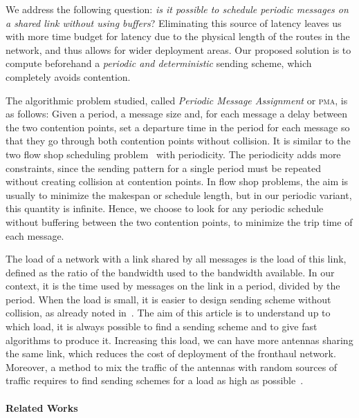 \documentclass[a4paper,UKenglish,cleveref, autoref, thm-restate]{lipics-v2019}
\newcommand\pma{\textsc{pma}\xspace}
\begin{document}
We address the following question: \emph{is it possible to schedule periodic messages on a shared link without using buffers}? Eliminating this source of latency leaves us with more time budget for latency due to the physical length of the routes in the network, and thus allows for wider deployment areas. Our proposed solution is to compute beforehand a \emph{periodic and deterministic} sending scheme, which completely avoids contention.  

The algorithmic problem studied, called \emph{Periodic Message Assignment} or \pma, is as follows: Given a period, a message size and, for each message a delay between the two contention points, set a departure time in the period for each message so that they go through both contention points without collision. It is similar to the two flow shop scheduling problem~\cite{yu2004minimizing} with periodicity. The periodicity adds more constraints, since the sending pattern for a single period must be repeated without creating collision at contention points. In flow shop problems, the aim is usually to minimize the makespan or schedule length, but in our periodic variant, this quantity is infinite. Hence, we choose to look for any periodic schedule without buffering between the two contention points, to minimize the trip time of each message. 

The load of a network with a link shared by all messages is the load of this link, defined as the ratio of the bandwidth used to the bandwidth available. In our context, it is the time used by messages on the link in a period, divided by the period. When the load is small, it is easier to design sending scheme without collision, as already noted in~\cite{barth2018deterministic}.
The aim of this article is to understand up to which load, it is always possible to find a sending scheme and to give fast algorithms to produce it. Increasing this load, we can have more antennas sharing the same link, which reduces the cost of deployment of the fronthaul network. Moreover, a method to mix the traffic of the antennas with random sources of traffic requires to find sending schemes for a load as high as possible~\cite{bartharxiv2018deterministic}. 

\paragraph*{Related Works}
\end{document}
